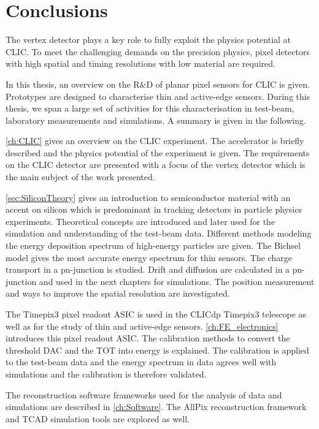 \chapter{Conclusions}
\label{ch:conclusions}


The vertex detector plays a key role to fully exploit the physics
potential at CLIC. To meet the challenging demands on the precision
physics, pixel detectors with high spatial and timing resolutions with
low material are required.

In this thesis, an overview on the R\&D of planar pixel sensors for
CLIC is given. Prototypes are designed to characterise thin and
active-edge sensors. During this thesis, we span a large set of
activities for this characterisation in test-beam, laboratory
measurements and simulations. A summary is given in the following.

\cref{ch:CLIC} gives an overview on the CLIC experiment. The
accelerator is briefly described and the physics potential of the
experiment is given. The requirements on the CLIC detector are
presented with a focus of the vertex detector which is the main
subject of the work presented.

\cref{sec:SiliconTheory} gives an introduction to semiconductor
material with an accent on silicon which is predominant in tracking
detectors in particle physics experiments. Theoretical concepts are
introduced and later used for the simulation and understanding of the
test-beam data. Different methods modeling the energy deposition
spectrum of high-energy particles are given. The Bichsel model gives
the most accurate energy spectrum for thin sensors. The charge
transport in a pn-junction is studied. Drift and diffusion are
calculated in a pn-junction and used in the next chapters for
simulations. The position measurement and ways to improve the spatial
resolution are investigated.

The Timepix3 pixel readout ASIC is used in the CLICdp Timepix3
telescope as well as for the study of thin and active-edge
sensors. \cref{ch:FE_electronics} introduces this pixel readout
ASIC. The calibration methods to convert the threshold DAC and the TOT
into energy is explained. The calibration is applied to the test-beam
data and the energy spectrum in data agrees well with simulations and
the calibration is therefore validated.

The reconstruction software frameworks used for the analysis of data
and simulations are described in \cref{ch:Software}. The AllPix
reconstruction framework and TCAD simulation tools are explored as
well.


